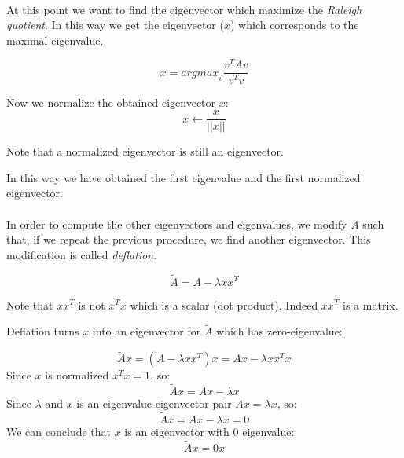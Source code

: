 \paragraph{}

At this point we want to find the eigenvector which maximize the \textit{Raleigh quotient}. In this way we get the eigenvector ($x$) which corresponds to the maximal eigenvalue.

\begin{equation*}
    x = \mathit{argmax}_v \frac{v^T A v}{v^T v}
\end{equation*}

Now we normalize the obtained eigenvector $x$:
\begin{equation*}
    x \leftarrow \frac{x}{||x||}
\end{equation*}

Note that a normalized eigenvector is still an eigenvector.

In this way we have obtained the first eigenvalue and the first normalized eigenvector.

\paragraph{}

In order to compute the other eigenvectors and eigenvalues, we modify $A$ such that, if we repeat the previous procedure, we find another eigenvector. This modification is called \textit{deflation}.

\begin{equation*}
    \tilde{A} = A - \lambda x x^T
\end{equation*}

Note that $x x^T$ is not $x^T x$ which is a scalar (dot product). Indeed $x x^T$ is a matrix.

Deflation turns $x$ into an eigenvector for $\tilde{A}$ which has zero-eigenvalue:

\begin{equation*}
    \tilde{A}x = (A - \lambda x x^T) x = Ax - \lambda x x^T x
\end{equation*}
Since $x$ is normalized $x^T x = 1$, so:
\begin{equation*}
    \tilde{A}x = Ax - \lambda x
\end{equation*}
Since $\lambda$ and $x$ is an eigenvalue-eigenvector pair $Ax = \lambda x$, so:
\begin{equation*}
    \tilde{A}x = Ax - \lambda x = 0
\end{equation*}
We can conclude that $x$ is an eigenvector with 0 eigenvalue:
\begin{equation*}
    \tilde{A}x = 0x
\end{equation*}

